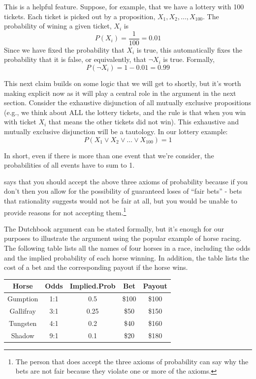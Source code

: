 \documentclass[]{tufte-book}
\begin{document}
This is a helpful feature. Suppose, for example, that we have a lottery with 100 tickets. Each ticket is picked out by a proposition, \(X_1, X_2, \ldots, X_{100}\). The probability of wining a given ticket, \(X_i\) is
\[
P(X_i)=\frac{1}{100}=0.01
\]
Since we have fixed the probability that \(X_i\) is true, this automatically fixes the probability that it is false, or equivalently, that \(\neg X_i\) is true. Formally,
\[
P(\neg X_i) = 1-0.01 = 0.99
\]

This next claim builds on some logic that we will get to shortly, but it's worth making explicit now as it will play a central role in the argument in the next section. Consider the exhaustive disjunction of all mutually exclusive propositions (e.g., we think about ALL the lottery tickets, and the rule is that when you win with ticket \(X_i\) that means the other tickets did not win). This exhaustive and mutually exclusive disjunction will be a tautology. In our lottery example:
\[
P(X_1 \vee X_2 \vee \ldots \vee X_{100}) = 1
\]

In short, even if there is more than one event that we're consider, the probabilities of all events have to sum to 1.

 says that you should accept the above three axioms of probability because if you don't then you allow for the possibility of guaranteed loses of ``fair bets'' - bets that rationality suggests would not be fair at all, but you would be unable to provide reasons for not accepting them.\footnote{The person that does accept the three axioms of probability can say why the bets are not fair because they violate one or more of the axioms.}

The Dutchbook argument can be stated formally, but it's enough for our purposes to illustrate the argument using the popular example of horse racing. The following table lists all the names of four horses in a race, including the odds and the implied probability of each horse winning. In addition, the table lists the cost of a bet and the corresponding payout if the horse wins.

\begin{longtable}[]{@{}ccccc@{}}
\toprule
Horse & Odds & Implied.Prob & Bet & Payout\tabularnewline
\midrule
\endhead
Gumption & 1:1 & 0.5 & \$100 & \$100\tabularnewline
Gallifray & 3:1 & 0.25 & \$50 & \$150\tabularnewline
Tungsten & 4:1 & 0.2 & \$40 & \$160\tabularnewline
Shadow & 9:1 & 0.1 & \$20 & \$180\tabularnewline
\bottomrule
\end{longtable}
\end{document}

